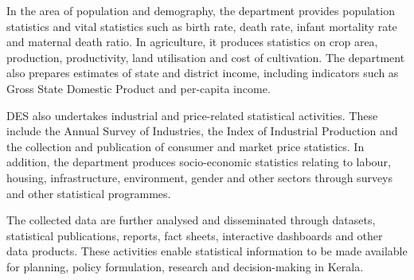 \documentclass[12pt,a4paper]{article}
\begin{document}
In the area of population and demography, the department provides population statistics and vital statistics such as birth rate, death rate, infant mortality rate and maternal death ratio. In agriculture, it produces statistics on crop area, production, productivity, land utilisation and cost of cultivation. The department also prepares estimates of state and district income, including indicators such as Gross State Domestic Product and per-capita income.

DES also undertakes industrial and price-related statistical activities. These include the Annual Survey of Industries, the Index of Industrial Production and the collection and publication of consumer and market price statistics. In addition, the department produces socio-economic statistics relating to labour, housing, infrastructure, environment, gender and other sectors through surveys and other statistical programmes.

The collected data are further analysed and disseminated through datasets, statistical publications, reports, fact sheets, interactive dashboards and other data products. These activities enable statistical information to be made available for planning, policy formulation, research and decision-making in Kerala.
\end{document}
